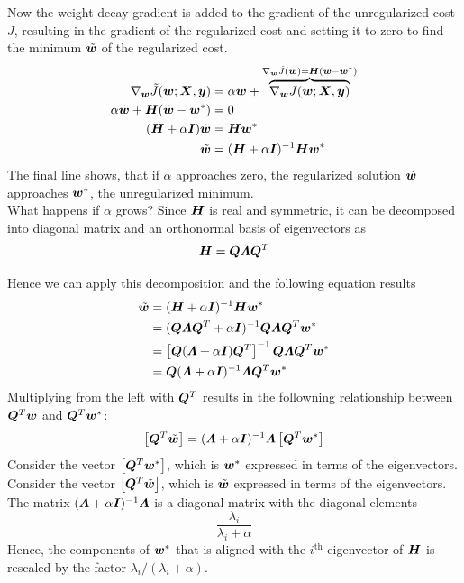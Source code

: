 \begin{multicols}{2}
	Now the weight decay gradient is added to the gradient of the unregularized cost $J$, resulting in the gradient of the regularized cost and setting it to zero to find the minimum $\tilde{{\bm{w}}}$ of the regularized cost.
	\begin{align*}
	\nabla_{\bm{w}} \tilde{J}({\bm{w}};{\bm{X}},{\bm{y}}) 
	&= \alpha{\bm{w}} + \overbrace{\nabla_{\bm{w}} J({\bm{w}};{\bm{X}},{\bm{y}})}^{\nabla_{\bm{w}}\hat{J}({\bm{w}})={\bm{H}}({\bm{w}}-{\bm{w}}^\ast)}\\
	\alpha\tilde{{\bm{w}}}+{\bm{H}}(\tilde{{\bm{w}}}-{\bm{w}}^\ast) &= 0\\
	({\bm{H}}+\alpha{\bm{I}})\tilde{{\bm{w}}} &= {\bm{H}}{\bm{w}}^\ast\\
	\tilde{{\bm{w}}}&=({\bm{H}}+\alpha{\bm{I}})^{-1}{\bm{H}}{\bm{w}}^\ast
	\end{align*}
	The final line shows, that if $\alpha$ approaches zero, the regularized solution $\tilde{{\bm{w}}}$ approaches ${\bm{w}}^\ast$, the unregularized minimum.\\
	What happens if $\alpha$ grows? Since ${\bm{H}}$ is real and symmetric, it can be decomposed into diagonal matrix and an orthonormal basis of eigenvectors as 
	\[ \mH = \mQ\bol{\Lambda}\mQ^T \]
	
	Hence we can apply this decomposition and the following equation results
	\begin{align*}
	\tilde{\vw}	&= (\mH+\alpha\mI)^{-1}\mH\vw^\ast\\
	&= (\mQ\bol{\Lambda}\mQ^T+\alpha\mI)^{-1}\mQ\bol{\Lambda}\mQ^T\vw^\ast\\
	&=\left[\mQ(\bol{\Lambda}+\alpha\mI)\mQ^T\right]^{-1}\mQ\bol{\Lambda}\mQ^T\vw^\ast\\
	&= \mQ(\bol{\Lambda}+\alpha\mI)^{-1}\bol{\Lambda}\mQ^T\vw^\ast
	\end{align*}
	Multiplying from the left with ${\bm{Q}}^T$ results in the followning relationship between ${\bm{Q}}^T\tilde{{\bm{w}}}$ and ${\bm{Q}}^T{\bm{w}}^\ast$:
	\[ \left[\mQ^T\tilde{\vw}\right] =(\bol{\Lambda}+\alpha\mI)^{-1}\bol{\Lambda}\left[\mQ^T\vw^\ast\right] \]
	Consider the vector $\left[{\bm{Q}}^T{\bm{w}}^\ast\right]$, which is ${\bm{w}}^\ast$ expressed in terms of the eigenvectors.\\
	Consider the vector $\left[{\bm{Q}}^T\tilde{{\bm{w}}}\right]$, which is $\tilde{{\bm{w}}}$ expressed in terms of the eigenvectors.\\
	The matrix $(\bol{\Lambda}+\alpha\mI)^{-1}\bol{\Lambda}$ is a diagonal matrix with the diagonal elements
	\[ \frac{\lambda_i}{\lambda_i+\alpha} \]
	Hence, the components of ${\bm{w}}^\ast$ that is aligned with the $i^{\text{th}}$ eigenvector of ${\bm{H}}$ is rescaled by the factor $\lambda_i/(\lambda_i+\alpha)$.\\
	

\end{multicols}
